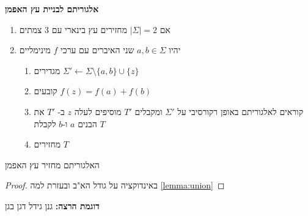 \textbf{אלגוריתם לבניית עץ האפמן}
\begin{enumerate}
\item
אם
$|\Sigma| = 2$
מחזירים עץ בינארי עם 3 צמתים
\item
יהיו 
$a,b \in \Sigma$
שני האיברים עם ערכי $f$ מינימליים
\begin{enumerate}
\item
מגדירים
$\Sigma' \leftarrow \Sigma \setminus \{a,b\} \cup \{z\}$
\item
קובעים 
$f(z) = f(a) + f(b)$
\item
קוראים לאלגוריתם באופן רקורסיבי על 
$\Sigma'$
ומקבלים 
$T'$
מוסיפים לעלה $z$ ב-%
$T'$
את הבנים $a$ ו-$b$ לקבלת $T$
\item
מחזירים $T$
\end{enumerate}
\end{enumerate}

\begin{claim}
האלגוריתם מחזיר עץ האפמן
\end{claim}
\begin{proof}
באינדוקציה על גודל הא"ב ובעזרת למה
\ref{lemma:union}
\end{proof}
\textbf{דוגמת הרצה:}
גנן גידל דגן בגן
